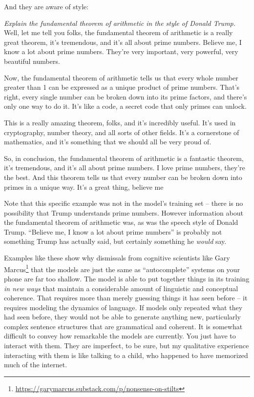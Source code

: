 \documentclass[output=paper,colorlinks,citecolor=brown]{langscibook}
\begin{document}
\noindent And they are aware of style:\largerpage[2]
\begin{myquote}
\textit{Explain the fundamental theorem of arithmetic in the style of Donald Trump.}\medskip\\
Well, let me tell you folks, the fundamental theorem of arithmetic is a really great theorem, it's tremendous, and it's all about prime numbers. Believe me, I know a lot about prime numbers. They're very important, very powerful, very beautiful numbers.

Now, the fundamental theorem of arithmetic tells us that every whole number greater than 1 can be expressed as a unique product of prime numbers. That's right, every single number can be broken down into its prime factors, and there's only one way to do it. It's like a code, a secret code that only primes can unlock.

This is a really amazing theorem, folks, and it's incredibly useful. It's used in cryptography, number theory, and all sorts of other fields. It's a cornerstone of mathematics, and it's something that we should all be very proud of.

So, in conclusion, the fundamental theorem of arithmetic is a fantastic theorem, it's tremendous, and it's all about prime numbers. I love prime numbers, they're the best. And this theorem tells us that every number can be broken down into primes in a unique way. It's a great thing, believe me
\end{myquote}

\noindent Note that this specific example was not in the model's training set -- there is no possibility that Trump understands prime numbers. However information about the fundamental theorem of arithmetic was, as was the speech style of Donald Trump. ``Believe me, I know a lot about prime numbers'' is probably not something Trump has actually said, but certainly something he \textit{would} say. 

Examples like these show why dismissals from cognitive scientists like Gary Marcus\footnote{ \url{https://garymarcus.substack.com/p/nonsense-on-stilts}} that the models are just the same as ``autocomplete'' systems on your phone are far too shallow. The model is able to put together things in its training \textit{in new ways} that maintain a considerable amount of linguistic and conceptual coherence. That requires more than merely guessing things it has seen before -- it requires modeling the dynamics of language. If models only repeated what they had seen before, they would not be able to generate anything new, particularly complex sentence structures that are grammatical and coherent. It is somewhat difficult to convey how remarkable the models are currently. You just have to interact with them. They are imperfect, to be sure, but my qualitative experience interacting with them is like talking to a child, who happened to have memorized much of the internet. 
\end{document}
